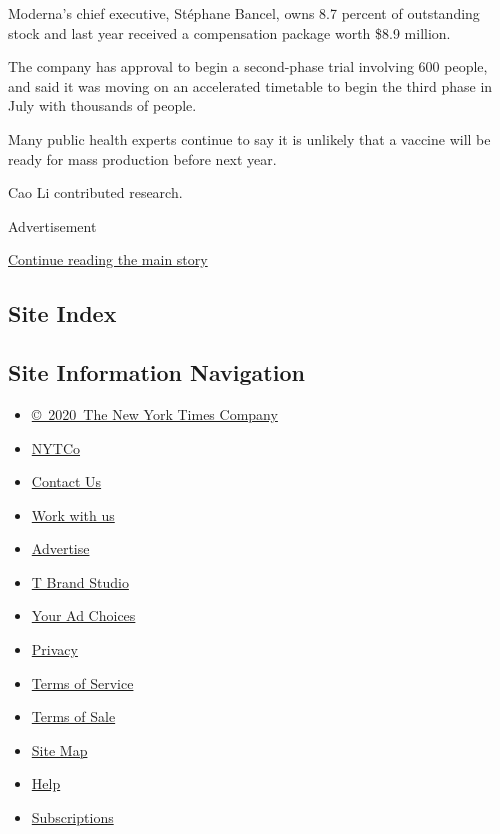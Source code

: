 Moderna's chief executive, Stéphane Bancel, owns 8.7 percent of
outstanding stock and last year received a compensation package worth
\$8.9 million.

The company has approval to begin a second-phase trial involving 600
people, and said it was moving on an accelerated timetable to begin the
third phase in July with thousands of people.

Many public health experts continue to say it is unlikely that a vaccine
will be ready for mass production before next year.

Cao Li contributed research.

Advertisement

\protect\hyperlink{after-bottom}{Continue reading the main story}

\hypertarget{site-index}{%
\subsection{Site Index}\label{site-index}}

\hypertarget{site-information-navigation}{%
\subsection{Site Information
Navigation}\label{site-information-navigation}}

\begin{itemize}
\tightlist
\item
  \href{https://help.nytimes3xbfgragh.onion/hc/en-us/articles/115014792127-Copyright-notice}{©~2020~The
  New York Times Company}
\end{itemize}

\begin{itemize}
\tightlist
\item
  \href{https://www.nytco.com/}{NYTCo}
\item
  \href{https://help.nytimes3xbfgragh.onion/hc/en-us/articles/115015385887-Contact-Us}{Contact
  Us}
\item
  \href{https://www.nytco.com/careers/}{Work with us}
\item
  \href{https://nytmediakit.com/}{Advertise}
\item
  \href{http://www.tbrandstudio.com/}{T Brand Studio}
\item
  \href{https://www.nytimes3xbfgragh.onion/privacy/cookie-policy\#how-do-i-manage-trackers}{Your
  Ad Choices}
\item
  \href{https://www.nytimes3xbfgragh.onion/privacy}{Privacy}
\item
  \href{https://help.nytimes3xbfgragh.onion/hc/en-us/articles/115014893428-Terms-of-service}{Terms
  of Service}
\item
  \href{https://help.nytimes3xbfgragh.onion/hc/en-us/articles/115014893968-Terms-of-sale}{Terms
  of Sale}
\item
  \href{https://spiderbites.nytimes3xbfgragh.onion}{Site Map}
\item
  \href{https://help.nytimes3xbfgragh.onion/hc/en-us}{Help}
\item
  \href{https://www.nytimes3xbfgragh.onion/subscription?campaignId=37WXW}{Subscriptions}
\end{itemize}

